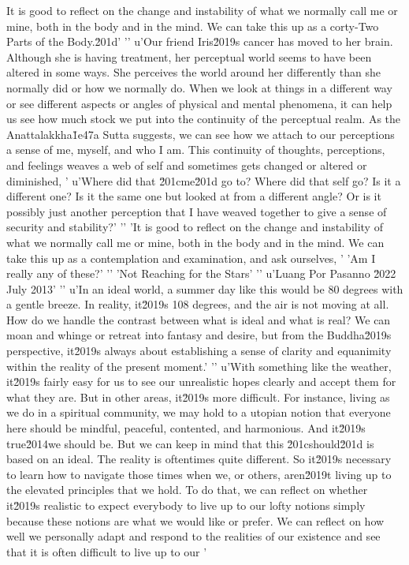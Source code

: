 It is good to reflect on the change and instability of what we normally 
call me or mine, both in the body and in the mind. We can take this up 
as a corty-Two Parts of the Body.\u201d'
'\n'
u'Our friend Iris\u2019s cancer has moved to her brain. Although she is having treatment, her perceptual world seems to have been altered in some ways. She perceives the world around her differently than she normally did or how we normally do. When we look at things in a different way or see different aspects or angles of physical and mental phenomena, it can help us see how much stock we put into the continuity of the perceptual realm. As the Anattalakkha\u1e47a Sutta suggests, we can see how we attach to our perceptions a sense of me, myself, and who I am. This continuity of thoughts, perceptions, and feelings weaves a web of self and sometimes gets changed or altered or diminished, '
u'Where did that \u201cme\u201d go to? Where did that self go? Is it a different one? Is it the same one but looked at from a different angle? Or is it possibly just another perception that I have weaved together to give a sense of security and stability?'
'\n'
'It is good to reflect on the change and instability of what we normally call me or mine, both in the body and in the mind. We can take this up as a contemplation and examination, and ask ourselves, '
'Am I really any of these?'
'\n'
'Not Reaching for the Stars'
'\n'
u'Luang Por Pasanno \u2022 July 2013'
'\n'
u'In an ideal world, a summer day like this would be 80 degrees with a gentle breeze. In reality, it\u2019s 108 degrees, and the air is not moving at all. How do we handle the contrast between what is ideal and what is real? We can moan and whinge or retreat into fantasy and desire, but from the Buddha\u2019s perspective, it\u2019s always about establishing a sense of clarity and equanimity within the reality of the present moment.'
'\n'
u'With something like the weather, it\u2019s fairly easy for us to see our unrealistic hopes clearly and accept them for what they are. But in other areas, it\u2019s more difficult. For instance, living as we do in a spiritual community, we may hold to a utopian notion that everyone here should be mindful, peaceful, contented, and harmonious. And it\u2019s true\u2014we should be. But we can keep in mind that this \u201cshould\u201d is based on an ideal. The reality is oftentimes quite different. So it\u2019s necessary to learn how to navigate those times when we, or others, aren\u2019t living up to the elevated principles that we hold. To do that, we can reflect on whether it\u2019s realistic to expect everybody to live up to our lofty notions simply because these notions are what we would like or prefer. We can reflect on how well we personally adapt and respond to the realities of our existence and see that it is often difficult to live up to our '
